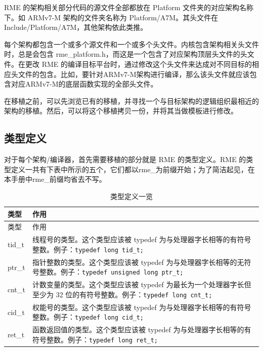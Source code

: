 RME 的架构相关部分代码的源文件全部都放在 Platform 文件夹的对应架构名称下。如 ARMv7-M 架构的文件夹名称为 Platform/A7M。其头文件在 Include/Platform/A7M，其他架构依此类推。

每个架构都包含一个或多个源文件和一个或多个头文件。内核包含架构相关头文件时，总是会包含 rme\_platform.h，而这是一个包含了对应架构顶层头文件的头文件。在更改 RME 的编译目标平台时，通过修改这个头文件来达成对不同目标的相应头文件的包含。比如，要针对ARMv7-M架构进行编译，那么该头文件就应该包含对应ARMv7-M的底层函数实现的全部头文件。

在移植之前，可以先浏览已有的移植，并寻找一个与目标架构的逻辑组织最相近的架构的移植。然后，可以将这个移植拷贝一份，并将其当做模板进行修改。

\subsection{类型定义}\label{subsec:7-type-definitions}

对于每个架构/编译器，首先需要移植的部分就是 RME 的类型定义。RME 的类型定义一共有下表中所示的五个，它们都以rme\_为前缀开始；为了简洁起见，在本手册中rme\_前缀均省去不写。

\begin{xltabular}{\textwidth}{@{}>{\hsize\raggedright\arraybackslash}X>{\hsize\raggedright\arraybackslash}X@{}}
\caption{类型定义一览}\label{tab:7-1-type-definitions-overview}\\
\toprule
类型 & 作用\tabularnewline
\endfirsthead
\toprule
类型 & 作用\tabularnewline
\midrule
\endhead
\bottomrule
\endlastfoot
    tid\_t & 线程号的类型。这个类型应该被 typedef 为与处理器字长相等的有符号整数。\newline 例子：\texttt{typedef long tid\_t;}\tabularnewline
    ptr\_t & 指针整数的类型。这个类型应该被 typedef 为与处理器字长相等的无符号整数。\newline 例子：\texttt{typedef unsigned long ptr\_t;}\tabularnewline
    cnt\_t & 计数变量的类型。这个类型应该被 typedef 为最长为一个处理器字长但至少为 32 位的有符号整数。\newline 例子：\texttt{typedef long cnt\_t;}\tabularnewline
    cid\_t & 权能号的类型。这个类型应该被 typedef 为与处理器字长相等的有符号整数。\newline 例子：\texttt{typedef long cid\_t;}\tabularnewline
    ret\_t & 函数返回值的类型。这个类型应该被 typedef 为与处理器字长相等的有符号整数。\newline 例子：\texttt{typedef long ret\_t;}\tabularnewline
\end{xltabular}

